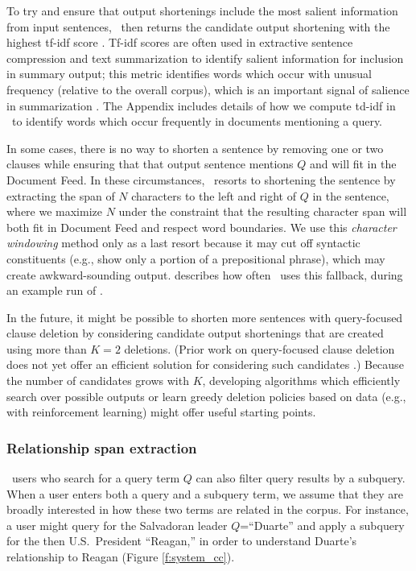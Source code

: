To try and ensure that output shortenings include the most salient information from input sentences, \ours~then returns the candidate output shortening with the highest tf-idf score \cite{irbook}.
Tf-idf scores are often used in extractive sentence compression
\cite{clarke2008,filippova-strube-2008-dependency} and text summarization \cite{das2007survey} to identify salient information for inclusion in summary output;
this metric identifies words which occur with unusual frequency (relative to the overall corpus), which is an important signal of salience in summarization \cite{sumbasic}.
The Appendix includes details of how we compute td-idf in \ours~to identify words which occur frequently in documents mentioning a query.


In some cases, there is no way to shorten a sentence by removing one or two clauses while ensuring that that output sentence mentions $Q$ and will fit in the Document Feed. 
In these circumstances, \ours~resorts to shortening the sentence by extracting the span of $N$ characters to the left and right of $Q$ in the sentence, where we maximize $N$ under the constraint that the resulting character span will both fit in Document Feed and respect word boundaries.
We use this \textit{character windowing} method only as a last resort because it may cut off syntactic constituents (e.g., show only a portion of a prepositional phrase), which may create awkward-sounding output.
 describes how often \ours~uses this fallback, during an example run of \ours. 

In the future, it might be possible to shorten more sentences with query-focused clause deletion by considering candidate output shortenings that are created using more than $K=2$ deletions.
(Prior work on query-focused clause deletion does not yet offer an efficient solution for considering such candidates \cite{Handler2019HumanAJ}.)
Because the number of candidates grows with $K$, developing algorithms which efficiently search over possible outputs or learn greedy deletion policies based on data (e.g., with reinforcement learning) might offer useful starting points. 


\subsubsection{Relationship span extraction}\label{s:rsum_extraction}

\ours~users who search for a query term $Q$ can also filter query results by a subquery.
When a user enters both a query and a subquery term, we assume that they are broadly interested in how these two terms are related in the corpus.
For instance, a user might query for the Salvadoran leader  $Q$=``Duarte'' and apply a subquery for the then U.S.\ President ``Reagan,'' in order to understand Duarte's relationship to Reagan (Figure \ref{f:system_cc}). 

